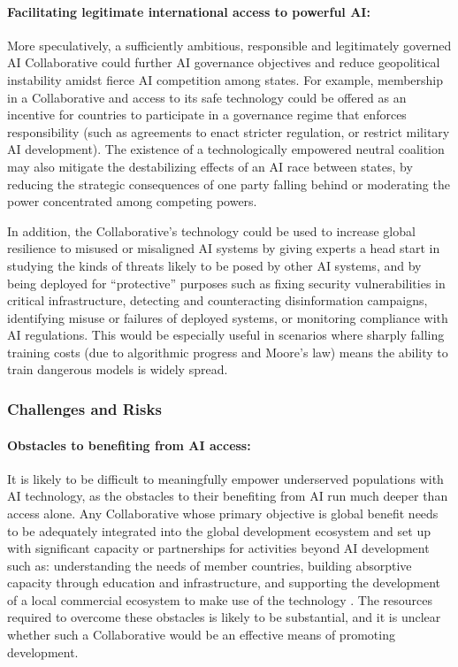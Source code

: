 \documentclass[12pt]{article}
\begin{document}
\paragraph{Facilitating legitimate international access to powerful AI:}
More speculatively, a sufficiently ambitious, responsible and
legitimately governed AI Collaborative could further AI governance
objectives and reduce geopolitical instability amidst fierce AI
competition among states. For example, membership in a Collaborative and
access to its safe technology could be offered as an incentive for
countries to participate in a governance regime that enforces
responsibility (such as agreements to enact stricter regulation, or
restrict military AI development). The existence of a technologically
empowered neutral coalition may also mitigate the destabilizing effects
of an AI race between states, by reducing the strategic consequences of
one party falling behind or moderating the power concentrated among
competing powers.

In addition, the Collaborative's technology could be used to increase
global resilience to misused or misaligned AI systems by giving experts
a head start in studying the kinds of threats likely to be posed by
other AI systems, and by being deployed for ``protective'' purposes such
as fixing security vulnerabilities in critical infrastructure, detecting
and counteracting disinformation campaigns, identifying misuse or
failures of deployed systems, or monitoring compliance with AI
regulations. This would be especially useful in scenarios where sharply
falling training costs (due to algorithmic progress and Moore's law)
means the ability to train dangerous models is widely spread.


\subsubsection*{Challenges and Risks}

\paragraph{Obstacles to benefiting from AI access:} It is likely to be
difficult to meaningfully empower underserved populations with AI
technology, as the obstacles to their benefiting from AI run much deeper
than access alone. Any Collaborative whose primary objective is global
benefit needs to be adequately integrated into the global development
ecosystem and set up with significant capacity or partnerships for
activities beyond AI development such as: understanding the needs of
member countries, building absorptive capacity through education and
infrastructure, and supporting the development of a local commercial
ecosystem to make use of the technology \cite{noauthor_unfccc_nodate, maya_capacity_2010}.
The resources required to overcome these obstacles is likely to be
substantial, and it is unclear whether such a Collaborative would be an
effective means of promoting development.
\end{document}
